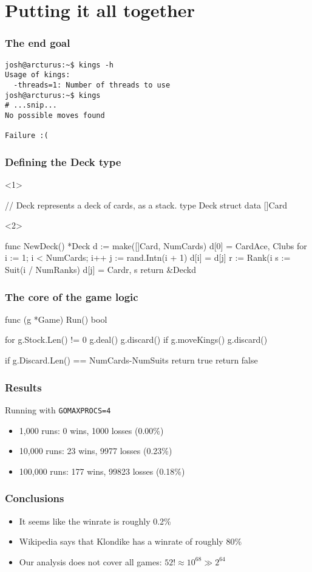 \documentclass{beamer}
\begin{document}
\section{Putting it all together}

\begin{frame}[fragile]
\frametitle{The end goal}
\begin{verbatim}
josh@arcturus:~$ kings -h
Usage of kings:
  -threads=1: Number of threads to use
josh@arcturus:~$ kings
# ...snip...
No possible moves found

Failure :(
\end{verbatim}
\end{frame}

\begin{frame}[fragile]
\frametitle{Defining the Deck type}
\begin{onlyenv}<1>
\begin{gocode}
// Deck represents a deck of cards, as a stack.
type Deck struct {
        data []Card
}
\end{gocode}
\end{onlyenv}
\begin{onlyenv}<2>
\begin{gocode}
func NewDeck() *Deck {
        d := make([]Card, NumCards)
        d[0] = Card{Ace, Clubs}
        for i := 1; i < NumCards; i++ {
                j := rand.Intn(i + 1)
                d[i] = d[j]
                r := Rank(i%
                s := Suit(i / NumRanks)
                d[j] = Card{r, s}
        }
        return &Deck{d}
}

\end{gocode}
\end{onlyenv}
\end{frame}

\begin{frame}[fragile]
\frametitle{The core of the game logic}
\begin{gocode}
func (g *Game) Run() bool {
        for g.Stock.Len() != 0 {
                g.deal()
                g.discard()
                if g.moveKings() {
                        g.discard()
                }
        }

        if g.Discard.Len() == NumCards-NumSuits {
                return true
        }
        return false
}
\end{gocode}
\end{frame}

\begin{frame}
\frametitle{Results}
Running with \texttt{GOMAXPROCS=4}
\begin{itemize}
\item 1,000 runs: 0 wins, 1000 losses (0.00\%)
\item 10,000 runs: 23 wins, 9977 losses (0.23\%)
\item 100,000 runs: 177 wins, 99823 losses (0.18\%)
\end{itemize}
\end{frame}

\begin{frame}
\frametitle{Conclusions}
\begin{itemize}
\item It seems like the winrate is roughly 0.2\%
\item Wikipedia says that Klondike has a winrate of roughly 80\%
\item Our analysis does not cover all games: $52! \approx 10^{68} \gg 2^{64}$
\end{itemize}
\end{frame}
\end{document}
